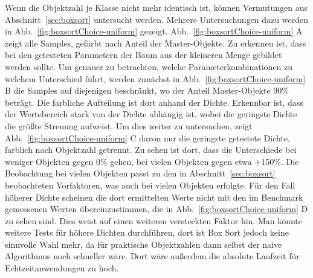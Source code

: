 Wenn die Objektzahl je Klasse nicht mehr identisch ist, können Vermutungen aus Abschnitt~\ref{sec:boxsort} untersucht werden.
Mehrere Untersuchungen dazu werden in Abb.~\ref{fig:boxsortChoice-uniform} gezeigt. Abb.~\ref{fig:boxsortChoice-uniform} A zeigt alle Samples, gefärbt nach Anteil der Master-Objekte. Zu erkennen ist, dass bei den getesteten Parametern der Baum aus der kleineren Menge gebildet werden sollte. Um genauer zu betrachten, welche Parameterkombinationen zu welchem Unterschied führt, werden zunächst in Abb.~\ref{fig:boxsortChoice-uniform} B die Samples auf diejenigen beschränkt, wo der Anteil Master-Objekte 90\% beträgt. Die farbliche Aufteilung ist dort anhand der Dichte. Erkennbar ist, dass der Wertebereich stark von der Dichte abhängig ist, wobei die geringste Dichte die größte Streuung aufweist. Um dies weiter zu untersuchen, zeigt Abb.~\ref{fig:boxsortChoice-uniform} C davon nur die geringste getestete Dichte, farblich nach Objektzahl getrennt. Zu sehen ist dort, dass die Unterschiede bei weniger Objekten gegen 0\% gehen, bei vielen Objekten gegen etwa +150\%. Die Beobachtung bei vielen Objekten passt zu den in Abschnitt~\ref{sec:boxsort} beobachteten Vorfaktoren, was auch bei vielen Objekten erfolgte. Für den Fall höherer Dichte scheinen die dort ermittelten Werte nicht mit den im Benchmark gemessenen Werten übereinzustimmen, die in Abb.~\ref{fig:boxsortChoice-uniform} D zu sehen sind. Dies weist auf einen weiteren versteckten Faktor hin. Man könnte weitere Tests für höhere Dichten durchführen, dort ist Box Sort jedoch keine sinnvolle Wahl mehr, da für praktische Objektzahlen dann selbst der naive Algorithmus noch schneller wäre. Dort wäre außerdem die absolute Laufzeit für Echtzeitanwendungen zu hoch.\\

